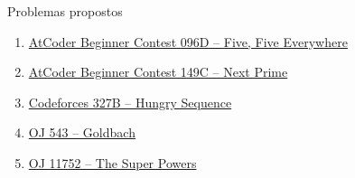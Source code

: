 \begin{frame}[fragile]{Problemas propostos}

    \begin{enumerate}
        \item \href{https://atcoder.jp/contests/abc096/tasks/abc096_d}{AtCoder Beginner Contest 096D -- Five, Five Everywhere}
        \item \href{https://atcoder.jp/contests/abc149/tasks/abc149_c}{AtCoder Beginner Contest 149C -- Next Prime}
        \item \href{https://codeforces.com/problemset/problem/327/B}{Codeforces 327B -- Hungry Sequence}
        \item \href{http://onlinejudge.org/index.php?option=com_onlinejudge&Itemid=8&category=24&page=show_problem&problem=484}{OJ 543 -- Goldbach}
        \item \href{https://onlinejudge.org/index.php?option=com_onlinejudge&Itemid=8&category=24&page=show_problem&problem=2852}{OJ 11752 -- The Super Powers}
    \end{enumerate}

\end{frame}
